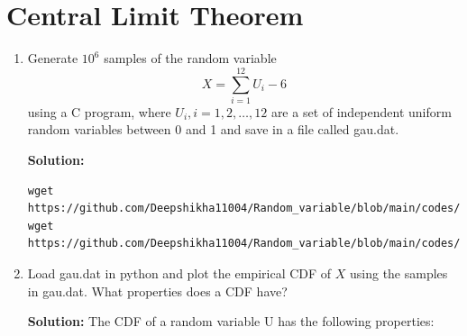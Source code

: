 \documentclass[journal,12pt,twocolumn]{IEEEtran}
\renewcommand\thesection{\arabic{section}}
\begin{document}
\section{Central Limit Theorem}
%
\begin{enumerate}[label=\thesection.\arabic*
,ref=\thesection.\theenumi]

%
\item
Generate $10^6$ samples of the random variable
%
\begin{equation}
X = \sum_{i=1}^{12}U_i -6
\end{equation}
%
using a C program, where $U_i, i = 1,2,\dots, 12$ are  a set of independent uniform random variables between 0 and 1
and save in a file called gau.dat.

\textbf{Solution:}
\begin{lstlisting}
wget https://github.com/Deepshikha11004/Random_variable/blob/main/codes/main.c
wget https://github.com/Deepshikha11004/Random_variable/blob/main/codes/coeffs.h
\end{lstlisting}

%
\item
Load gau.dat in python and plot the empirical CDF of $X$ using the samples in gau.dat. What properties does a CDF have?


\textbf{Solution:}
The CDF of a random variable U has the following properties:


\end{enumerate}
\end{document}
